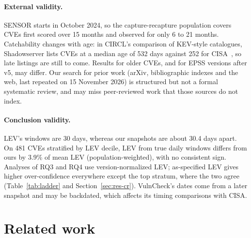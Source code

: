 \paragraph{External validity.} SENSOR starts in October 2024, so the
capture-recapture population covers CVEs first scored over 15 months and
observed for only 6 to 21 months. Catchability changes with age: in CIRCL's
comparison of KEV-style catalogues, Shadowserver lists CVEs at a median age of
532 days against 252 for CISA~\cite{circl2026kevcatalogs}, so late listings are
still to come. Results for older CVEs, and for EPSS versions after v5, may
differ. Our search for prior work (arXiv, bibliographic indexes and the web, last
repeated on 15 November 2026) is structured but not a formal systematic review,
and may miss peer-reviewed work that those sources do not index.

\paragraph{Conclusion validity.} LEV's windows are 30 days, whereas our
snapshots are about 30.4 days apart. On 481 CVEs stratified by LEV decile, LEV
from true daily windows differs from ours by 3.9\% of mean LEV
(population-weighted), with no consistent sign. Analyses of RQ3 and RQ4 use
version-normalized LEV; as-specified LEV gives higher over-confidence
everywhere except the top stratum, where the two agree (Table~\ref{tab:ladder}
and Section~\ref{sec:res-cr}). VulnCheck's dates come from a later snapshot and
may be backdated, which affects its timing comparisons with CISA.

\section{Related work}\label{sec:related}

